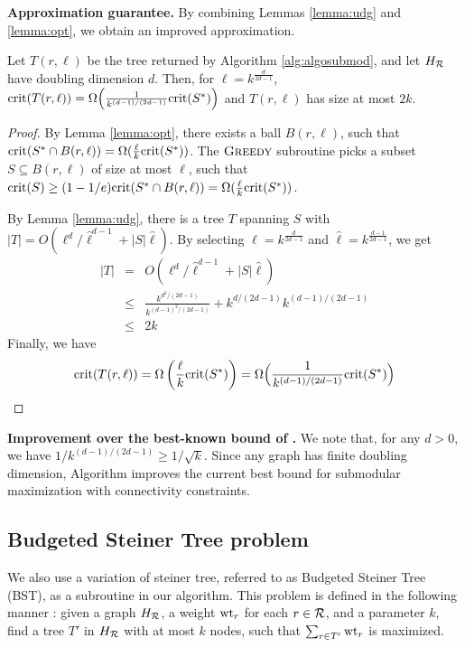 \noindent
\textbf{Approximation guarantee.} By combining Lemmas \ref{lemma:udg} and \ref{lemma:opt}, we obtain an improved approximation.
\begin{theorem}
\label{theorem:submod}
Let $T(r, \ell)$ be the tree returned by Algorithm \ref{alg:algosubmod}, and let $H_{\mathcal{R}}$ have doubling dimension $d$. Then, for $\ell=k^{\frac{d}{2d-1}}$, $\text{crit}(T(r, \ell))=\Omega\Big(\frac{1}{k^{(d-1)/(2d-1)}} \text{crit}(S^*)\Big)$ and $T(r, \ell)$ has size at most $2k$.
\end{theorem}
\begin{proof}
By Lemma \ref{lemma:opt}, there exists a ball $B(r, \ell)$, such that $\text{crit}(S^*\cap B(r, \ell))=\Omega(\frac{\ell}{k}\text{crit}(S^*))$.
The $\textsc{Greedy}$ subroutine picks a subset $S\subseteq B(r, \ell)$ of size at most $\ell$, such that $\text{crit}(S)\geq(1-1/e) \text{crit}(S^*\cap B(r, \ell)) = \Omega(\frac{\ell}{k} \text{crit}(S^*))$.

By Lemma \ref{lemma:udg}, there is a tree $T$ spanning $S$ with $|T|=O(\ell^d/\hat{\ell}^{d-1}+|S|\hat{\ell})$.
By selecting $\ell=k^{\frac{d}{2d-1}}$ and $\hat{\ell}=k^{\frac{d-1}{2d-1}}$, we get
\begin{eqnarray*}
|T| &=&O(\ell^d/\hat{\ell}^{d-1}+|S|\hat{\ell})\\
&\leq& \frac{k^{d^2/(2d-1)}}{k^{(d-1)^2/(2d-1)}} + k^{d/(2d-1)}k^{(d-1)/(2d-1)}\\
&\leq& 2k
\end{eqnarray*}
Finally, we have 
\[
\text{crit}(T(r, \ell))=\Omega\left(\frac{\ell}{k}\text{crit}(S^*)\right) = \Omega\Big(\frac{1}{k^{(d-1)/(2d-1)}} \text{crit}(S^*)\Big)
\]
\end{proof}

\noindent
\textbf{Improvement over the best-known bound of \cite{kuo2015maximizing}.} We note that, for any $d> 0$, we have $1/k^{(d-1)/(2d-1)}\geq 1/\sqrt{k}$. Since any graph has finite doubling dimension, Algorithm \algosubmod{} improves the current best bound for submodular maximization with connectivity constraints.


\subsection{Budgeted Steiner Tree problem}
\label{sec:algomaxst}
We also use a variation of steiner tree, referred to as Budgeted Steiner Tree (\textsc{BST}), as a subroutine in our algorithm. This problem is defined in the following manner \cite{Johnson2000PCS}:
given a graph $H_{\mathcal{R}}$, a weight $\text{wt}_r$ for each $r\in \mathcal{R}$, and a parameter $k$, find a tree $T'$ in $H_{\mathcal{R}}$ with at most $k$ nodes, such that $\sum_{r\in T'} \text{wt}_r$ is maximized.

